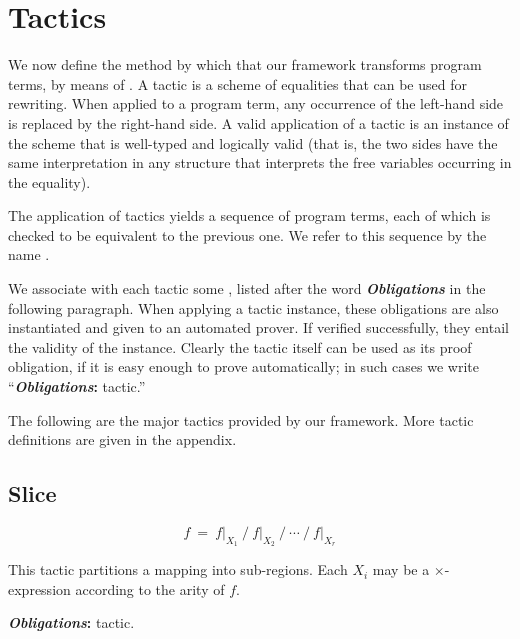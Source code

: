 \section{Tactics}
\label{tactics}

We now define the method by which that our framework transforms program terms, by means of .
A tactic is a scheme of equalities that can be used for rewriting.
When applied to a program term, any occurrence of the left-hand side is replaced by the right-hand side.
A valid application of a tactic is an instance of the scheme that is well-typed and logically valid
(that is, the two sides have the same interpretation in any structure that interprets the free
variables occurring in the equality).

The application of tactics yields a sequence of program terms, each of which is checked to
be equivalent to the previous one. We refer to this sequence by the name .

We associate with each tactic some , listed after the word \textbf{\textit{Obligations}}
in the following paragraph.
When applying a tactic instance, these obligations are also instantiated and given to an automated prover. 
If verified successfully, they entail the validity of the instance. 
Clearly the tactic itself can be used as its proof obligation, if it is easy enough to prove automatically; 
in such cases we write ``\textbf{\textit{Obligations}:} tactic.''

The following are the major tactics provided by our framework. 
More tactic definitions are given in the appendix.

\newcommand\Obligations{\medskip\noindent\textbf{\textit{Obligations}:} }
\newcommand\reduce{\operatorname{reduce}}
\newcommand\listConcat{{\scriptstyle \,++\,}}

\theoremstyle{definition}
\newtheorem{tactic}{Tactic}

\newcommand\tacticdef[1]{\subsection*{#1}}

\tacticdef{Slice} \label{tactics:Slice}
\[f ~=~ f\big|_{X_1} ~\Big/~ f\big|_{X_2} ~\Big/ ~\cdots~ \Big/~ f\big|_{X_r}\] 

This tactic partitions a mapping into sub-regions. Each $X_i$ may be a $\times$-expression
according to the arity of $f$.

\Obligations tactic.

